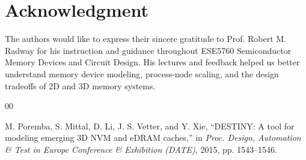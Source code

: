 \documentclass[conference]{IEEEtran}
\begin{document}
\section*{Acknowledgment}

The authors would like to express their sincere gratitude to Prof. Robert M. Radway for his instruction and guidance throughout ESE5760 Semiconductor Memory Devices and Circuit Design. His lectures and feedback helped us better understand memory device modeling, process-node scaling, and the design tradeoffs of 2D and 3D memory systems.

\begin{thebibliography}{00}

M. Poremba, S. Mittal, D. Li, J. S. Vetter, and Y. Xie, ``DESTINY: A tool for modeling emerging 3D NVM and eDRAM caches,'' in \textit{Proc. Design, Automation \& Test in Europe Conference \& Exhibition (DATE)}, 2015, pp. 1543--1546.




\end{thebibliography}
\end{document}
